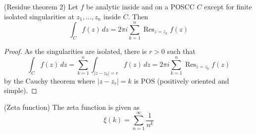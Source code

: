 \vspace{2ex}
\begin{thm}
(Residue theorem 2) Let $f$ be analytic inside and on a POSCC $C$ except for finite isolated singularities at $z_1,\ldots ,z_{n}$ inside $C$. Then
\[\int_{C}f(z)\,dz=2\pi i\sum _{k=1}^{n}\mathop{\mathrm{Res}}_{z=z_k}f(z)\]
\end{thm}
\vspace{2ex}
\begin{proof}
As the singularities are isolated, there is $r>0$ such that 
\[\int _{C}f(z)\,dz=\sum ^{n}_{k=1}\int _{|z-z_{k}|=r}f(z)\,dz=2\pi i\sum ^{n}_{k=1}\mathop{\mathrm{Res}}_{z=z_{k}}f(z)\]
by the Cauchy theorem where $|z-z_{r}|=k$ is POS (positively oriented and simple).
\end{proof}
\vspace{2ex}
\begin{defi}
(Zeta function) The zeta function is given as
\[\xi(k)=\sum ^{\infty }_{n=1}\dfrac{1}{n^{k}}\]
\end{defi}
\vspace{2ex}
